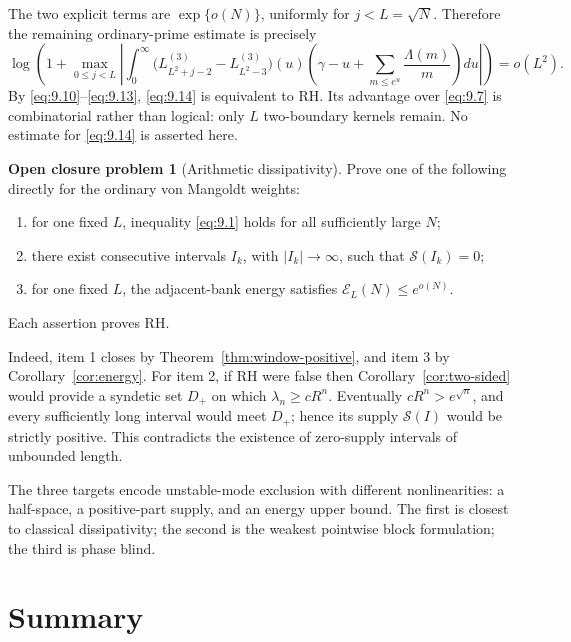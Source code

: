 \documentclass[11pt]{amsart}
\numberwithin{equation}{section}
\theoremstyle{definition}
\newtheorem{problem}[theorem]{Open closure problem}
\theoremstyle{remark}
\begin{document}
The two explicit terms are \(\exp\{o(N)\}\), uniformly for
\(j<L=\sqrt N\). Therefore the remaining ordinary-prime estimate is
precisely
\begin{equation}
 \boxed{
 \log\!\left(1+\max_{0\le j<L}\left|
 \int_0^\infty
 \bigl(L_{L^2+j-2}^{(3)}-L_{L^2-3}^{(3)}\bigr)(u)
 \left(\gamma-u+\sum_{m\le e^u}\frac{\Lambda(m)}m\right)du
 \right|\right)=o(L^2).}                                \label{eq:9.14}
\end{equation}
By \eqref{eq:9.10}--\eqref{eq:9.13}, \eqref{eq:9.14} is equivalent to RH.  Its advantage over
\eqref{eq:9.7} is combinatorial rather than logical: only \(L\) two-boundary
kernels remain.  No estimate for \eqref{eq:9.14} is asserted here.

\begin{problem}[Arithmetic dissipativity]
\label{prob:closure}
Prove one of the following directly for the ordinary von Mangoldt weights:
\begin{enumerate}
\item for one fixed \(L\), inequality \eqref{eq:9.1} holds for all sufficiently
      large \(N\);
\item there exist consecutive intervals \(I_k\), with
      \(|I_k|\to\infty\), such that \(\mathcal S(I_k)=0\);
\item for one fixed \(L\), the adjacent-bank energy satisfies
      \(\mathcal E_L(N)\le e^{o(N)}\).
\end{enumerate}
Each assertion proves RH.
\end{problem}

Indeed, item 1 closes by Theorem~\ref{thm:window-positive}, and item 3 by
Corollary~\ref{cor:energy}. For item 2, if RH were false then
Corollary~\ref{cor:two-sided} would provide a syndetic set \(D_+\) on
which \(\lambda_n\ge cR^n\). Eventually \(cR^n>e^{\sqrt n}\), and every
sufficiently long interval would meet \(D_+\); hence its supply
\(\mathcal S(I)\) would be strictly positive. This contradicts the
existence of zero-supply intervals of unbounded length.

The three targets encode unstable-mode exclusion with different
nonlinearities: a half-space, a positive-part supply, and an energy upper
bound. The first is closest to classical dissipativity; the second is the
weakest pointwise block formulation; the third is phase blind.

\section{Summary}
\end{document}
